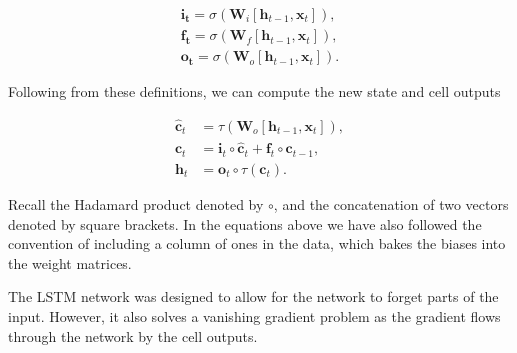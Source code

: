 \begin{align}
\mathbf{i_t} = \sigma(\mathbf{W}_i[\mathbf{h}_{t-1}, \mathbf{x}_t]),\\
\mathbf{f_t} = \sigma(\mathbf{W}_f[\mathbf{h}_{t-1}, \mathbf{x}_t]),\\
\mathbf{o_t} = \sigma(\mathbf{W}_o[\mathbf{h}_{t-1}, \mathbf{x}_t]).
\end{align}

\noindent Following from these definitions, we can compute the new state and cell outputs

\begin{align}
\hat{\mathbf{c}}_t &= \tau (\mathbf{W}_o[\mathbf{h}_{t-1}, \mathbf{x}_t]), \\
\mathbf{c}_t &= \mathbf{i}_t \circ \hat{\mathbf{c}}_t + \mathbf{f}_t \circ \mathbf{c}_{t-1}, \\ 
\mathbf{h}_t &= \mathbf{o}_t \circ \tau (\mathbf{c}_t).
\end{align}

\noindent Recall the Hadamard product denoted by $\circ$, and the concatenation of two vectors denoted by square brackets. In the equations above we have also followed the convention of including a column of ones in the data, which bakes the biases into the weight matrices. 

The LSTM network was designed to allow for the network to forget parts of the input. However, it also solves a vanishing gradient problem as the gradient flows through the network by the cell outputs.
